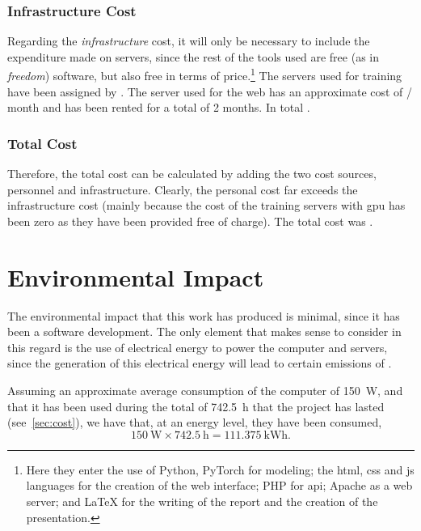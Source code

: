 \subsubsection{Infrastructure Cost}

Regarding the \emph{infrastructure} cost, it will only be necessary to include
the expenditure made on servers, since the rest of the tools used are free (as
in \emph{freedom}) software, but also free in terms of price.\footnote{Here
  they enter the use of Python, PyTorch for modeling; the \acs{html}, \acs{css}
  and \acs{js} languages for the creation of the web interface; PHP for
  \gls{api}; Apache as a web server; and \LaTeX{} for the writing of the report
  and the creation of the presentation.} The servers used for training have
been assigned by . The
server used for the web has an approximate cost of  / month and has
been rented for a total of 2 months. In total .

\subsubsection{Total Cost}

Therefore, the total cost can be calculated by adding the two cost sources,
personnel and infrastructure. Clearly, the personal cost far exceeds the
infrastructure cost (mainly because the cost of the training servers with
\gls{gpu} has been zero as they have been provided free of charge). The total
cost was .



\section{Environmental Impact}\label{sec:enviromental}

The environmental impact that this work has produced is minimal, since it has
been a software development. The only element that makes sense to consider in
this regard is the use of electrical energy to power the computer and servers,
since the generation of this electrical energy will lead to certain emissions
of .

Assuming an approximate average consumption of the computer of \SI{150}{\watt},
and that it has been used during the total of \SI{742.5}{\hour} that the
project has lasted (see\ \vref{sec:cost}), we have that, at an energy level,
they have been consumed,
\begin{equation}
  \SI{150}{\watt} \times \SI{742.5}{\hour} = \SI{111.375}{\kWh}.
\end{equation}

